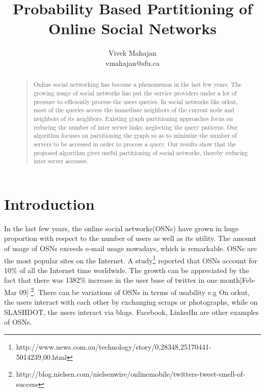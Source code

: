\documentclass[letterpaper]{article}
\begin{document}
%
\title{Probability Based Partitioning of Online Social Networks}
\author{Vivek Mahajan\\
vmahajan@sfu.ca\\
}
\maketitle
\begin{abstract}
\begin{quote}
Online social networking has  become a phenomenon in the last few years. The
growing usage of social networks has put the service providers under a lot of
pressure to efficiently process the users queries.  In social networks like
orkut, most of the queries access the immediate neighbors of the current node
and neighbors of its neighbors.  Existing graph partitioning approaches focus
on reducing the number of inter server links, neglecting the query patterns.
Our algorithm focuses on partitioning the graph so as to minimize the number of
servers to be accessed in order to process a query. Our results show that the
proposed algorithm gives useful partitioning of social networks, thereby
reducing inter server accesses.


\end{quote}
\end{abstract}

\section{Introduction}
    In the last few years, the online social networks(OSNs) have grown in huge
proportion with respect to the number of users as well as its utility. The
amount of usage of OSNs exceeds e-mail usage nowadays, which is remarkable.
OSNs are the most popular sites on the Internet. A
study\footnote{http://www.news.com.au/technology/story/0,28348,25170441-5014239,00.html}
reported that OSNs account for 10\% of all the Internet time worldwide. The
growth can be appreciated by the fact that there was 1382\% increase in the
user base of twitter in one month[Feb-Mar 09]
\footnote{http://blog.nielsen.com/nielsenwire/onlinemobile/twitters-tweet-smell-of-success}.
There can be variations of OSNs in terms of usability e.g On orkut, the users
interact with each other by exchanging scraps or photographs, while on
SLASHDOT, the users interact via blogs. Facebook, LinkedIn are other examples
of OSNs.
\end{document}

